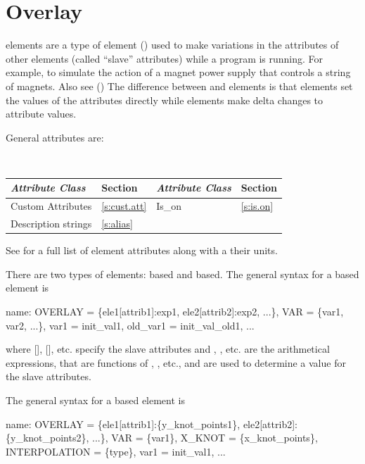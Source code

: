{\newpage

\section{Overlay}
\label{s:overlay}

 elements are a type of  element () used to make
variations in the attributes of other elements (called ``slave'' attributes) while a program is
running. For example, to simulate the action of a magnet power supply that controls a string of
magnets. Also see  () The difference between  and 
elements is that  elements set the values of the attributes directly while 
elements make delta changes to attribute values.

General  attributes are:
\begin{center}
\tt
\begin{tabular}{llll} \toprule
  {\sl Attribute Class}      & Section           & {\sl Attribute Class}      & Section         \\ \midrule
  Custom Attributes          & \ref{s:cust.att}  & Is_on                      & \ref{s:is.on}   \\
  Description strings        & \ref{s:alias}     &                            &                 \\ 
  \bottomrule
\end{tabular}
\end{center}
\toffset
See  for a full list of element attributes along with a their units.

There are two types of  elements:  based and  based.
The general syntax for a  based  element is
\begin{example}
  name: OVERLAY = \{ele1[attrib1]:exp1, ele2[attrib2]:exp2, ...\}, 
              VAR = \{var1, var2, ...\}, var1 = init_val1, old_var1 = init_val_old1, ...
\end{example}
where [], [], etc. specify the slave attributes and
, , etc. are the arithmetical expressions, that are functions of ,
, etc., and are used to determine a value for the slave attributes.

The general syntax for a  based  element is
\begin{example}
  name: OVERLAY = \{ele1[attrib1]:\{y_knot_points1\}, ele2[attrib2]:\{y_knot_points2\}, ...\}, 
              VAR = \{var1\}, X_KNOT = \{x_knot_points\}, INTERPOLATION = \{type\},
              var1 = init_val1, ...
\end{example}

}
